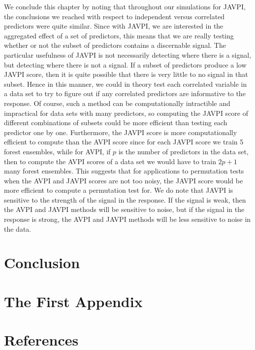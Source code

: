 \documentclass[12pt,twoside]{reedthesis}
\theoremstyle{definition}
\theoremstyle{definition}
\theoremstyle{definition}
\theoremstyle{remark}
\begin{document}
We conclude this chapter by noting that throughout our simulations for
JAVPI, the conclusions we reached with respect to independent versus
correlated predictors were quite similar. Since with JAVPI, we are
interested in the aggregated effect of a set of predictors, this means
that we are really testing whether or not the subset of predictors
contains a discernable signal. The particular usefulness of JAVPI is not
necessarily detecting where there is a signal, but detecting where there
is not a signal. If a subset of predictors produce a low JAVPI score,
then it is quite possible that there is very little to no signal in that
subset. Hence in this manner, we could in theory test each correlated
variable in a data set to try to figure out if any correlated predictors
are informative to the response. Of course, such a method can be
computationally intractible and impractical for data sets with many
predictors, so computing the JAVPI score of different combinations of
subsets could be more efficient than testing each predictor one by one.
Furthermore, the JAVPI score is more computationally efficient to
compute than the AVPI score since for each JAVPI score we train 5 forest
ensembles, while for AVPI, if \(p\) is the number of predictors in the
data set, then to compute the AVPI scores of a data set we would have to
train \(2p+1\) many forest ensembles. This suggests that for
applications to permutation tests when the AVPI and JAVPI scores are not
too noisy, the JAVPI score would be more efficient to compute a
permutation test for. We do note that JAVPI is sensitive to the strength
of the signal in the response. If the signal is weak, then the AVPI and
JAVPI methods will be sensitive to noise, but if the signal in the
response is strong, the AVPI and JAVPI methods will be less sensitive to
noise in the data. \par 

\chapter*{Conclusion}\label{conclusion}

\appendix

\chapter{The First Appendix}\label{the-first-appendix}

\backmatter

\chapter*{References}\label{references}
\end{document}
